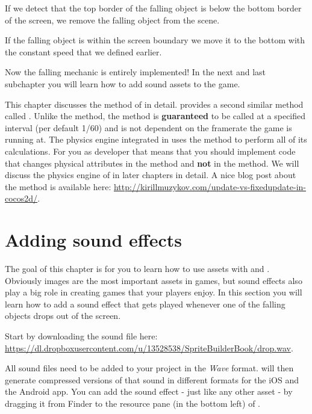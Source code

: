 If we detect that the top border of the falling object is below the bottom
border of the screen, we remove the falling object from the scene.

If the falling object is within the screen boundary we move it to the bottom
with the constant speed that we defined earlier.

Now the falling mechanic is entirely implemented! In the next and last
subchapter you will learn how to add sound assets to the game.

\begin{details}[frametitle={Update vs. Fixed Update}] 
This chapter discusses the  method of \cocos{} in detail.
\cocos{} provides a second similar method called
.
Unlike the  method, the  method is
\textbf{guaranteed} to be called at a specified interval (per default 1/60) and
is not dependent on the framerate the game is running at. The physics engine
integrated in \cocos{} uses the
 method to perform all of its calculations. For you as
developer that means that you should implement code that changes physical
attributes in the  method and \textbf{not} in the
 method. We will discuss the physics engine of \cocos{} in
later chapters in detail. A nice blog post about the 
method is available here:
\url{http://kirillmuzykov.com/update-vs-fixedupdate-in-cocos2d/}.
\end{details}

\section{Adding sound effects}
The goal of this chapter is for you to learn how to use assets with \SB{} and
\cocos{}. Obviously images are the most important assets in games, but sound
effects also play a big role in creating games that your players enjoy. In this
section you will learn how to add a sound effect that gets played whenever one
of the falling objects drops out of the screen.

Start by downloading the sound file here:
\url{https://dl.dropboxusercontent.com/u/13528538/SpriteBuilderBook/drop.wav}.

All sound files need to be added to your \SB{} project in the \textit{Wave}
format. \SB{} will then generate compressed versions of that sound in different
formats for the iOS and the Android app. You can add the sound effect - just
like any other asset - by dragging it from Finder to the resource pane (in the
bottom left) of \SB{}.

